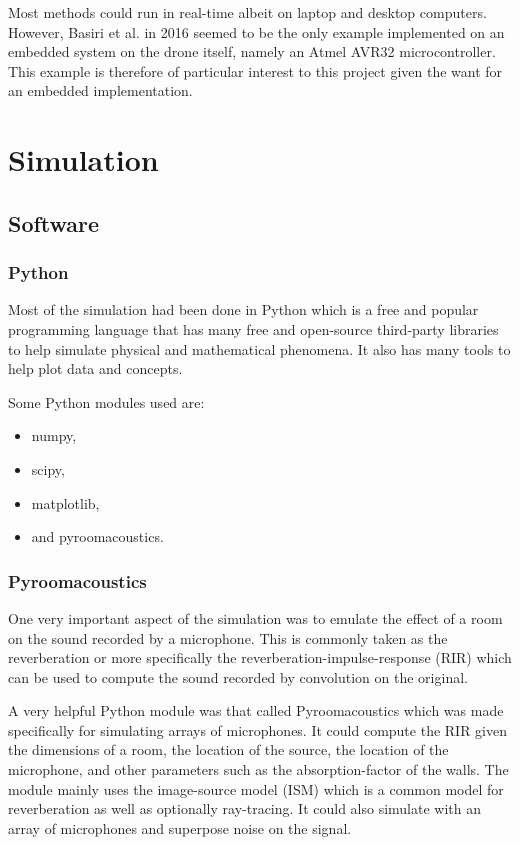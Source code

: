 \documentclass{report}
\begin{document}
Most methods could run in real-time albeit on laptop and desktop computers. However, Basiri et al. in 2016 \cite{basiri_-board_2016} seemed to be the only example implemented on an embedded system on the drone itself, namely an Atmel AVR32 microcontroller. This example is therefore of particular interest to this project given the want for an embedded implementation.




\chapter{Simulation}

\section{Software}

\subsection{Python}

Most of the simulation had been done in Python which is a free and popular programming language that has many free and open-source third-party libraries to help simulate physical and mathematical phenomena. It also has many tools to help plot data and concepts.

Some Python modules used are:
\begin{itemize}
	\item numpy,
	\item scipy,
	\item matplotlib,
	\item and pyroomacoustics.
\end{itemize}

\subsection{Pyroomacoustics}

One very important aspect of the simulation was to emulate the effect of a room on the sound recorded by a microphone. This is commonly taken as the reverberation or more specifically the reverberation-impulse-response (RIR) which can be used to compute the sound recorded by convolution on the original.

A very helpful Python module was that called Pyroomacoustics which was made specifically for simulating arrays of microphones. It could compute the RIR given the dimensions of a room, the location of the source, the location of the microphone, and other parameters such as the absorption-factor of the walls. The module mainly uses the image-source model (ISM) which is a common model for reverberation as well as optionally ray-tracing. It could also simulate with an array of microphones and superpose noise on the signal.
\end{document}
